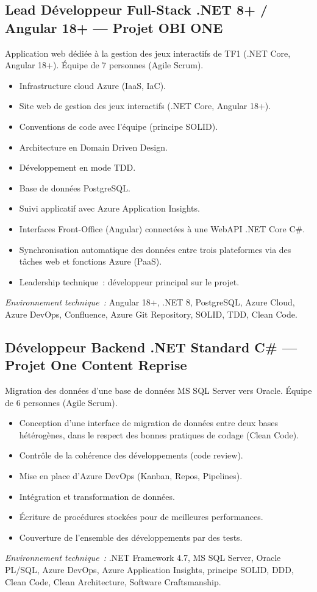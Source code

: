 \documentclass[10pt,a4paper]{article}
\begin{document}
\vspace{6pt}

\subsection*{Lead Développeur Full-Stack .NET 8+ / Angular 18+ --- Projet OBI ONE}
\color{darkgray}
Application web dédiée à la gestion des jeux interactifs de TF1 (.NET Core, Angular 18+). Équipe de 7 personnes (Agile Scrum).
\begin{itemize}
  \item Infrastructure cloud Azure (IaaS, IaC).
  \item Site web de gestion des jeux interactifs (.NET Core, Angular 18+).
  \item Conventions de code avec l'équipe (principe SOLID).
  \item Architecture en Domain Driven Design.
  \item Développement en mode TDD.
  \item Base de données PostgreSQL.
  \item Suivi applicatif avec Azure Application Insights.
  \item Interfaces Front-Office (Angular) connectées à une WebAPI .NET Core C\#.
  \item Synchronisation automatique des données entre trois plateformes via des tâches web et fonctions Azure (PaaS).
  \item Leadership technique~: développeur principal sur le projet.
\end{itemize}
\textit{Environnement technique~:} Angular 18+, .NET 8, PostgreSQL, Azure Cloud, Azure DevOps, Confluence, Azure Git Repository, SOLID, TDD, Clean Code.

\vspace{6pt}

\subsection*{Développeur Backend .NET Standard C\# --- Projet One Content Reprise}
\color{darkgray}
Migration des données d'une base de données MS SQL Server vers Oracle. Équipe de 6 personnes (Agile Scrum).
\begin{itemize}
  \item Conception d'une interface de migration de données entre deux bases hétérogènes, dans le respect des bonnes pratiques de codage (Clean Code).
  \item Contrôle de la cohérence des développements (code review).
  \item Mise en place d'Azure DevOps (Kanban, Repos, Pipelines).
  \item Intégration et transformation de données.
  \item Écriture de procédures stockées pour de meilleures performances.
  \item Couverture de l'ensemble des développements par des tests.
\end{itemize}
\textit{Environnement technique~:} .NET Framework 4.7, MS SQL Server, Oracle PL/SQL, Azure DevOps, Azure Application Insights, principe SOLID, DDD, Clean Code, Clean Architecture, Software Craftsmanship.
\end{document}
